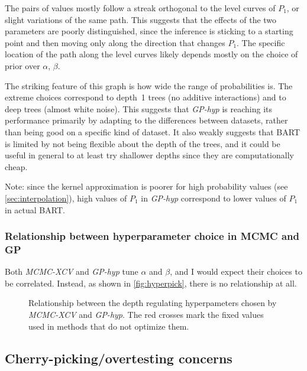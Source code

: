 \documentclass[a4paper]{article}
\theoremstyle{definition}
\newcommand{\widecenter}[1]{\noindent\hspace{-\textwidth}\makebox[3\textwidth][c]{#1}}
\newcommand{\includempl}[1]{\texttt{[image: \#1]}}
\begin{document}
    The pairs of values mostly follow a streak orthogonal to the level curves of $P_1$, or slight variations of the same path. This suggests that the effects of the two parameters are poorly distinguished, since the inference is sticking to a starting point and then moving only along the direction that changes $P_1$. The specific location of the path along the level curves likely depends mostly on the choice of prior over $\alpha$, $\beta$.

    The striking feature of this graph is how wide the range of probabilities is. The extreme choices correspond to depth~1 trees (no additive interactions) and to deep trees (almost white noise). This suggests that \emph{GP-hyp} is reaching its performance primarily by adapting to the differences between datasets, rather than being good on a specific kind of dataset. It also weakly suggests that BART is limited by not being flexible about the depth of the trees, and it could be useful in general to at least try shallower depths since they are computationally cheap.

    Note: since the kernel approximation is poorer for high probability values (see \autoref{sec:interpolation}), high values of $P_1$ in \emph{GP-hyp} correspond to lower values of $P_1$ in actual BART.

    \subsubsection{Relationship between hyperparameter choice in MCMC and GP}
    \label{sec:hyperpick}

    Both \emph{MCMC-XCV} and \emph{GP-hyp} tune $\alpha$ and $\beta$, and I would expect their choices to be correlated. Instead, as shown in \autoref{fig:hyperpick}, there is no relationship at all.

    \begin{figure}
        \widecenter{\includempl{articleplot6}}
        \caption{\label{fig:hyperpick} Relationship between the depth regulating hyperpameters chosen by \emph{MCMC-XCV} and \emph{GP-hyp}. The red crosses mark the fixed values used in methods that do not optimize them.}
    \end{figure}

    \subsection{Cherry-picking/overtesting concerns}
\end{document}
